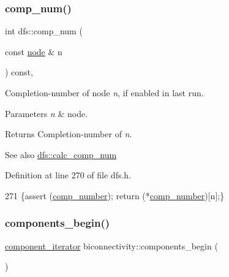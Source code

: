 \subsubsection{\texorpdfstring{comp\+\_\+num()}{comp\_num()}}
{\footnotesize\ttfamily int dfs\+::comp\+\_\+num (\begin{DoxyParamCaption}\item[{const \mbox{\hyperlink{classnode}{node}} \&}]{n }\end{DoxyParamCaption}) const\hspace{0.3cm}{\ttfamily [inline]}, {\ttfamily [inherited]}}



Completion-\/number of node {\itshape n}, if enabled in last run. 


\begin{DoxyParams}{Parameters}
{\em n} & node. \\
\hline
\end{DoxyParams}
\begin{DoxyReturn}{Returns}
Completion-\/number of {\itshape n}. 
\end{DoxyReturn}
\begin{DoxySeeAlso}{See also}
\mbox{\hyperlink{classdfs_a70862ea715c52eb95fb704afd3a6e676}{dfs\+::calc\+\_\+comp\+\_\+num}} 
\end{DoxySeeAlso}


Definition at line 270 of file dfs.\+h.


\begin{DoxyCode}
271     \{assert (\mbox{\hyperlink{classdfs_a00db016ac7eab69045cae408008890c1}{comp\_number}}); \textcolor{keywordflow}{return} (*\mbox{\hyperlink{classdfs_a00db016ac7eab69045cae408008890c1}{comp\_number}})[n];\}
\end{DoxyCode}
\mbox{\label{classbiconnectivity_ac0b7253533edc3f1412f771cb35bf04a}} 
\subsubsection{\texorpdfstring{components\+\_\+begin()}{components\_begin()}}
{\footnotesize\ttfamily \mbox{\hyperlink{classbiconnectivity_aef69aa0c23bfcd945e385350154b6483}{component\+\_\+iterator}} biconnectivity\+::components\+\_\+begin (\begin{DoxyParamCaption}{ }\end{DoxyParamCaption})\hspace{0.3cm}{\ttfamily [inline]}}




